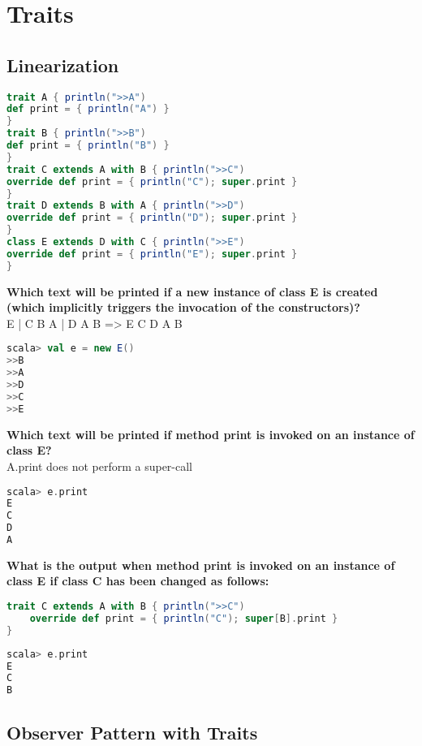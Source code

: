 \section{Traits}

\subsection{Linearization}
\begin{lstlisting}[language=Scala]
trait A { println(">>A")
def print = { println("A") }
}
trait B { println(">>B")
def print = { println("B") }
}
trait C extends A with B { println(">>C")
override def print = { println("C"); super.print }
}
trait D extends B with A { println(">>D")
override def print = { println("D"); super.print }
}
class E extends D with C { println(">>E")
override def print = { println("E"); super.print }
}
\end{lstlisting}

\textbf{Which text will be printed if a new instance of class E is created (which implicitly triggers the invocation of the constructors)?} \\
E | C B A | D A B => E C D A B
\begin{lstlisting}[language=Scala]
scala> val e = new E()
>>B
>>A
>>D
>>C
>>E
\end{lstlisting}

\textbf{Which text will be printed if method print is invoked on an instance of class E?} \\
A.print does not perform a super-call
\begin{lstlisting}[language=Scala]
scala> e.print
E
C
D
A
\end{lstlisting}

\textbf{What is the output when method print is invoked on an instance of class E if class C has been changed as follows:}
\begin{lstlisting}[language=Scala]
trait C extends A with B { println(">>C")
    override def print = { println("C"); super[B].print }
}
\end{lstlisting}

\begin{lstlisting}[language=Scala]
scala> e.print
E
C
B
\end{lstlisting}

\clearpage
\subsection{Observer Pattern with Traits}


